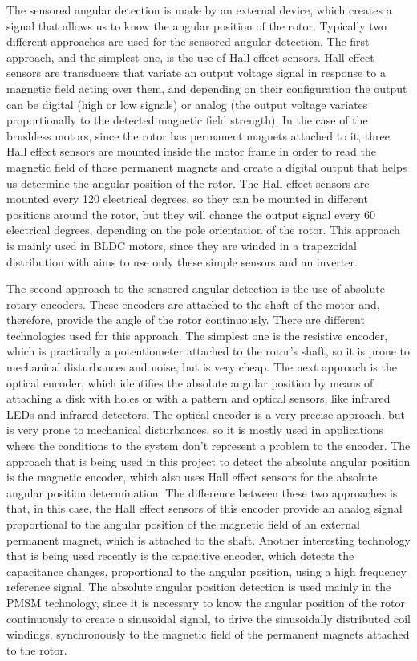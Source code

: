The sensored angular detection is made by an external device, which creates a signal that allows us to know the angular position of the rotor. Typically two different approaches are used for the sensored angular detection. The first approach, and the simplest one, is the use of Hall effect sensors. Hall effect sensors are transducers that variate an output voltage signal in response to a magnetic field acting over them, and depending on their configuration the output can be digital (high or low signals) or analog (the output voltage variates proportionally to the detected magnetic field strength). In the case of the brushless motors, since the rotor has permanent magnets attached to it, three Hall effect sensors are mounted inside the motor frame in order to read the magnetic field of those permanent magnets and create a digital output that helps us determine the angular position of the rotor. The Hall effect sensors are mounted every 120 electrical degrees, so they can be mounted in different positions around the rotor, but they will change the output signal every 60 electrical degrees, depending on the pole orientation of the rotor. This approach is mainly used in \ac{BLDC} motors, since they are winded in a trapezoidal distribution with aims to use only these simple sensors and an inverter.

The second approach to the sensored angular detection is the use of absolute rotary encoders. These encoders are attached to the shaft of the motor and, therefore, provide the angle of the rotor continuously. There are different technologies used for this approach. The simplest one is the resistive encoder, which is practically a potentiometer attached to the rotor's shaft, so it is prone to mechanical disturbances and noise, but is very cheap. The next approach is the optical encoder, which identifies the absolute angular position by means of attaching a disk with holes or with a pattern and optical sensors, like infrared LEDs and infrared detectors. The optical encoder is a very precise approach, but is very prone to mechanical disturbances, so it is mostly used in applications where the conditions to the system don't represent a problem to the encoder. The approach that is being used in this project to detect the absolute angular position is the magnetic encoder, which also uses Hall effect sensors for the absolute angular position determination. The difference between these two approaches is that, in this case, the Hall effect sensors of this encoder provide an analog signal proportional to the angular position of the magnetic field of an external permanent magnet, which is attached to the shaft. Another interesting technology that is being used recently is the capacitive encoder, which detects the capacitance changes, proportional to the angular position, using a high frequency reference signal. The absolute angular position detection is used mainly in the \ac{PMSM} technology, since it is necessary to know the angular position of the rotor continuously to create a sinusoidal signal, to drive the sinusoidally distributed coil windings, synchronously to the magnetic field of the permanent magnets attached to the rotor.

